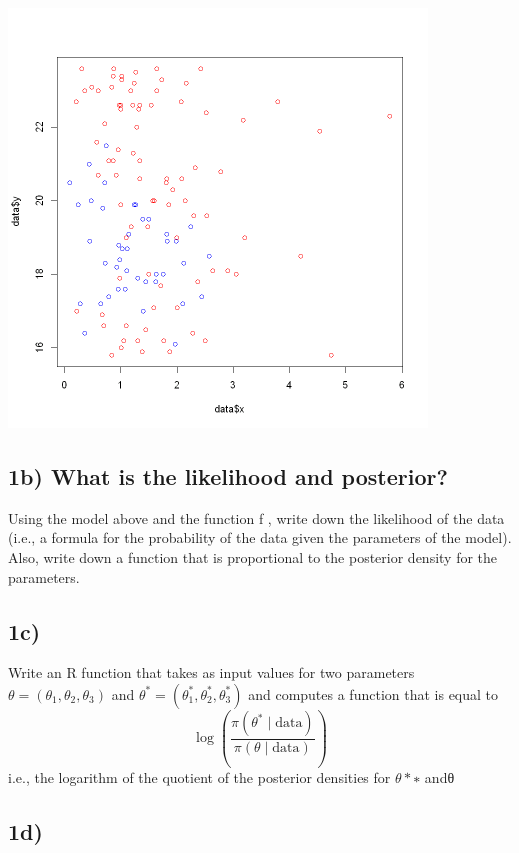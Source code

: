 \documentclass[
  letterpaper,
  DIV=11,
  numbers=noendperiod]{scrartcl}
\begin{document}
\includegraphics[width=4.375in,height=4.375in]{assignment_files/figure-latex/cell-3-output-1.png}

\subsection{1b) What is the likelihood and
posterior?}\label{b-what-is-the-likelihood-and-posterior}

Using the model above and the function f , write down the likelihood of
the data (i.e., a formula for the probability of the data given the
parameters of the model). Also, write down a function that is
proportional to the posterior density for the parameters.

\subsection{1c)}\label{c}

Write an R function that takes as input values for two parameters
\(θ = (θ_1, θ_2, θ_3)\) and
\(\theta^{*}=(\theta_{1}^{*},\theta_{2}^{*},\theta_{3}^{*})\) and
computes a function that is equal to \[
\log\left(\frac{\pi(\theta^{*}\mid\mathrm{data})}{\pi(\theta\mid\mathrm{data})}\right)
\] i.e., the logarithm of the quotient of the posterior densities for
\(θ*∗\) andθ

\subsection{1d)}\label{d}
\end{document}
